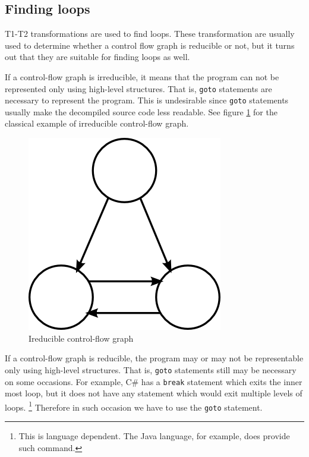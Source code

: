\documentclass[12pt,twoside,notitlepage]{report}
\begin{document}
\subsection{Finding loops}

T1-T2 transformations are used to find loops.
These transformation are usually used to determine whether
a control flow graph is reducible or not, but
it turns out that they are suitable for finding loops as well.

If a control-flow graph is irreducible, it means that the
program can not be represented only using high-level structures.
That is, \verb|goto| statements are necessary to represent the
program.  This is undesirable since \verb|goto| statements
usually make the decompiled source code less readable.
See figure \ref{Ireducible} for the classical example
of irreducible control-flow graph.

\begin{figure}[tbh]
\centerline{\includegraphics{figs/Ireducible.png}}
\caption{\label{Ireducible}Ireducible control-flow graph}
\end{figure}

If a control-flow graph is reducible, the program may or may not be
representable only using high-level structures.  That is,
\verb|goto| statements still may be necessary on some occasions.
For example, C\# has a \verb|break| statement which exits
the inner most loop, but it does not have any statement which
would exit multiple levels of loops.%
\footnote{This is language dependent.  
The Java language, for example, does provide such command.}
Therefore in such occasion we have to use the \verb|goto| statement.
\end{document}
